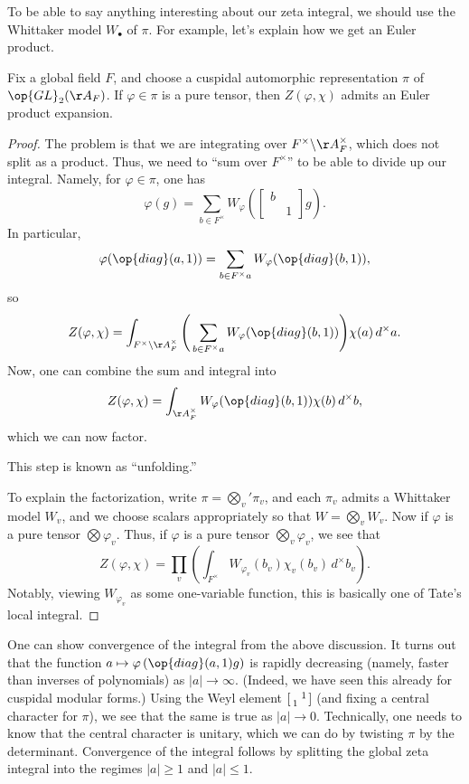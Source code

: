 \documentclass[../notes.tex]{subfiles}
\begin{document}
To be able to say anything interesting about our zeta integral, we should use the Whittaker model $W_\bullet$ of $\pi$. For example, let's explain how we get an Euler product.
\begin{lemma}
	Fix a global field $F$, and choose a cuspidal automorphic representation $\pi$ of $\op{GL}_2(\AA_F)$. If $\varphi\in\pi$ is a pure tensor, then $Z(\varphi,\chi)$ admits an Euler product expansion.
\end{lemma}
\begin{proof}
	The problem is that we are integrating over $F^\times\backslash\AA_F^\times$, which does not split as a product. Thus, we need to ``sum over $F^\times$'' to be able to divide up our integral. Namely, for $\varphi\in\pi$, one has
	\[\varphi(g)=\sum_{b\in F^\times}W_\varphi\left(\begin{bmatrix}
		b \\ & 1
	\end{bmatrix}g\right).\]
	In particular,
	\[\varphi(\op{diag}(a,1))=\sum_{b\in F^\times a}W_\varphi(\op{diag}(b,1)),\]
	so
	\[Z(\varphi,\chi)=\int_{F^\times\backslash\AA_F^\times}\Bigg(\sum_{b\in F^\times a}W_\varphi(\op{diag}(b,1))\Bigg)\chi(a)\,d^\times a.\]
	Now, one can combine the sum and integral into
	\[Z(\varphi,\chi)=\int_{\AA_F^\times}W_\varphi(\op{diag}(b,1))\chi(b)\,d^\times b,\]
	which we can now factor.
	\begin{remark}
		This step is known as ``unfolding.''
	\end{remark}
	To explain the factorization, write $\pi=\bigotimes_v'\pi_v$, and each $\pi_v$ admits a Whittaker model $W_v$, and we choose scalars appropriately so that $W=\bigotimes_vW_v$. Now if $\varphi$ is a pure tensor $\bigotimes\varphi_v$. Thus, if $\varphi$ is a pure tensor $\bigotimes_v\varphi_v$, we see that
	\[Z(\varphi,\chi)=\prod_v\left(\int_{F^\times}W_{\varphi_v}(b_v)\chi_v(b_v)\,d^\times b_v\right).\]
	Notably, viewing $W_{\varphi_v}$ as some one-variable function, this is basically one of Tate's local integral.
\end{proof}
\begin{remark}
	One can show convergence of the integral from the above discussion. It turns out that the function $a\mapsto\varphi\left(\op{diag}(a,1)g\right)$ is rapidly decreasing (namely, faster than inverses of polynomials) as $\left|a\right|\to\infty$. (Indeed, we have seen this already for cuspidal modular forms.) Using the Weyl element $\begin{bsmallmatrix}
		& 1 \\ 1
	\end{bsmallmatrix}$ (and fixing a central character for $\pi$), we see that the same is true as $\left|a\right|\to0$. Technically, one needs to know that the central character is unitary, which we can do by twisting $\pi$ by the determinant. Convergence of the integral follows by splitting the global zeta integral into the regimes $\left|a\right|\ge1$ and $\left|a\right|\le1$.
\end{remark}
\end{document}
